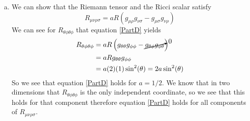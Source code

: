 \documentclass[11pt]{article}
\numberwithin{equation}{section}
\begin{document}
\begin{enumerate}[(a)]
\item
We can show that the Riemann tensor and the Ricci scalar satisfy
\begin{equation}
R_{\mu\nu\rho\sigma} = aR\left(g_{\mu\rho}g_{\nu\sigma} - g_{\mu\sigma}g_{\nu\rho}\right)
\label{PartD}
\end{equation}
We can see for $R_{\theta\phi\theta\phi}$ that equation \ref{PartD} yields
\begin{align*}
R_{\theta\phi\theta\phi} &= aR\left(g_{\theta\theta}g_{\phi\phi} - \cancelto{0}{g_{\theta\phi}g_{\phi\theta}}\right)\\
&= aRg_{\theta\theta}g_{\phi\phi}\\
&= a(2)(1)\sin^2(\theta) = 2a\sin^2(\theta) 
\end{align*}
So we see that equation \ref{PartD} holds for $a = 1/2$. We know that in two dimensions that $R_{\theta\phi\theta\phi}$ is the only independent coordinate, so we see that this holds for that component therefore equation \ref{PartD} holds for all components of $R_{\mu\nu\rho\sigma}$.
\end{enumerate}
\end{document}
